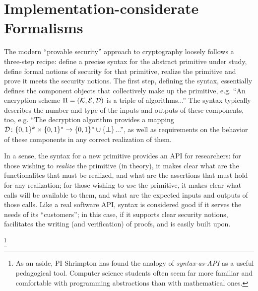 \section{Implementation-considerate Formalisms}
The modern ``provable security'' approach to cryptography loosely follows a
three-step recipe: define a precise syntax for the abstract primitive under
study, define formal notions of security for that primitive, realize the
primitive and prove it meets the security notions.  The first step, defining the
syntax, essentially defines the component objects that collectively make up the
primitive, e.g. ``An encryption scheme $\Pi=(\mathcal{K},\mathcal{E},\mathcal{D})$ is a triple of
algorithms...''  The syntax typically describes the number and type of the
inputs and outputs of these components, too, e.g. ``The decryption algorithm
provides a mapping $\mathcal{D}\colon\{0,1\}^{k}\times\{0,1\}^* \to \{0,1\}^* \cup
\{\bot\}$...'', as well as requirements on the behavior of these components in
any correct realization of them.

%
In a sense, the syntax for a new primitive provides an API for researchers: for
those wishing to \emph{realize} the primitive (in theory), it makes clear what
are the functionalites that must be realized, and what are the assertions that
must hold for any realization; for those wishing to \emph{use} the primitive, it
makes clear what calls will be available to them, and what are the expected
inputs and outputs of those calls.
%
Like a real software API, syntax is considered good if it serves the needs of
its ``customers''; in this case, if it supports clear security notions, facilitates the
writing (and verification) of proofs, and is easily built upon.
%
%
\footnote{As an aside, PI Shrimpton has found the analogy of
  \emph{syntax-as-API} as a useful pedagogical tool.  Computer science
  students often seem far more familiar and comfortable with
  programming abstractions than with mathematical ones.}


